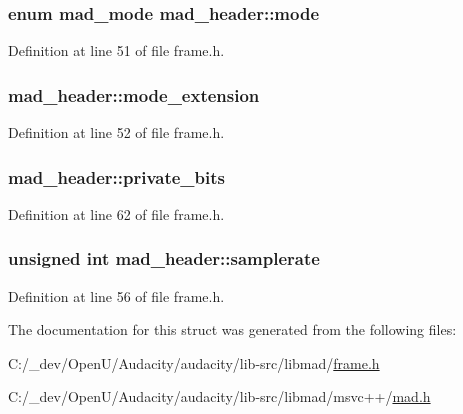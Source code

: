 \subsubsection[{\texorpdfstring{mode}{mode}}]{\setlength{\rightskip}{0pt plus 5cm}enum {\bf mad\+\_\+mode} mad\+\_\+header\+::mode}\hypertarget{structmad__header_a766a554a9ab575209f4bbd595e4f942c}{}\label{structmad__header_a766a554a9ab575209f4bbd595e4f942c}


Definition at line 51 of file frame.\+h.

\subsubsection[{\texorpdfstring{mode\+\_\+extension}{mode_extension}}]{ mad\+\_\+header\+::mode\+\_\+extension}\hypertarget{structmad__header_a1ba44705779d2ce1160f092cd3d2a158}{}\label{structmad__header_a1ba44705779d2ce1160f092cd3d2a158}


Definition at line 52 of file frame.\+h.

\subsubsection[{\texorpdfstring{private\+\_\+bits}{private_bits}}]{ mad\+\_\+header\+::private\+\_\+bits}\hypertarget{structmad__header_a420fd7325353f23c81192a0cc7adbf1b}{}\label{structmad__header_a420fd7325353f23c81192a0cc7adbf1b}


Definition at line 62 of file frame.\+h.

\subsubsection[{\texorpdfstring{samplerate}{samplerate}}]{\setlength{\rightskip}{0pt plus 5cm}unsigned {\bf int} mad\+\_\+header\+::samplerate}\hypertarget{structmad__header_ac6ca4dc0cbab5c4a7014bb8c26b9d06e}{}\label{structmad__header_ac6ca4dc0cbab5c4a7014bb8c26b9d06e}


Definition at line 56 of file frame.\+h.



The documentation for this struct was generated from the following files\+:\begin{DoxyCompactItemize}
\item 
C\+:/\+\_\+dev/\+Open\+U/\+Audacity/audacity/lib-\/src/libmad/\hyperlink{libmad_2frame_8h}{frame.\+h}\item 
C\+:/\+\_\+dev/\+Open\+U/\+Audacity/audacity/lib-\/src/libmad/msvc++/\hyperlink{lib-src_2libmad_2msvc_09_09_2mad_8h}{mad.\+h}\end{DoxyCompactItemize}
